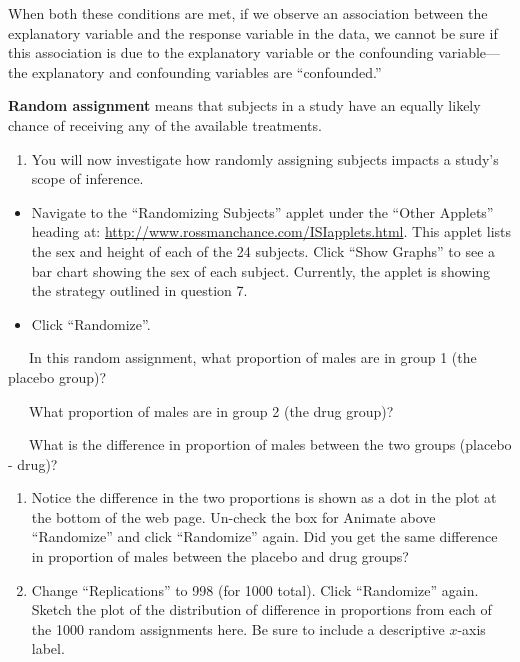 \documentclass[
]{report}
\providecommand{\tightlist}{%
  \setlength{\itemsep}{0pt}\setlength{\parskip}{0pt}}
\begin{document}
When both these conditions are met, if we observe an association between the explanatory variable and the response variable in the data, we cannot be sure if this association is due to the explanatory variable or the confounding variable---the explanatory and confounding variables are ``confounded.''

\textbf{Random assignment} means that subjects in a study have an equally likely chance of receiving any of the available treatments.

\begin{enumerate}
\def\labelenumi{\arabic{enumi}.}
\setcounter{enumi}{9}
\tightlist
\item
  You will now investigate how randomly assigning subjects impacts a study's scope of inference.
\end{enumerate}

\begin{itemize}
\item
  Navigate to the ``Randomizing Subjects'' applet under the ``Other Applets'' heading at: \url{http://www.rossmanchance.com/ISIapplets.html}. This applet lists the sex and height of each of the 24 subjects. Click ``Show Graphs'' to see a bar chart showing the sex of each subject. Currently, the applet is showing the strategy outlined in question 7.
\item
  Click ``Randomize''.
\end{itemize}

~~~In this random assignment, what proportion of males are in group 1 (the placebo group)?

\vspace{0.1in}

~~~What proportion of males are in group 2 (the drug group)?

\vspace{0.1in}

~~~What is the difference in proportion of males between the two groups (placebo - drug)?

\vspace{0.1in}

\begin{enumerate}
\def\labelenumi{\arabic{enumi}.}
\setcounter{enumi}{10}
\item
  Notice the difference in the two proportions is shown as a dot in the plot at the bottom of the web page. Un-check the box for Animate above ``Randomize'' and click ``Randomize'' again. Did you get the same difference in proportion of males between the placebo and drug groups?
  \vspace{0.25in}
\item
  Change ``Replications'' to 998 (for 1000 total). Click ``Randomize'' again. Sketch the plot of the distribution of difference in proportions from each of the 1000 random assignments here. Be sure to include a descriptive \(x\)-axis label.
  \vspace{1.25in}
\end{enumerate}
\end{document}
